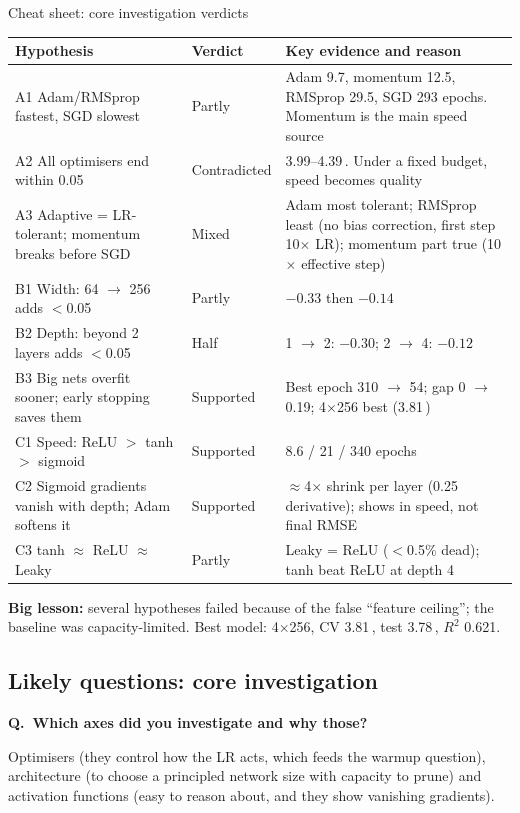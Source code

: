 \documentclass[11pt,a4paper]{article}
\newcommand{\A}{\,\text{\AA}}
\newcounter{qnum}
\newcommand{\Q}[1]{\refstepcounter{qnum}\par\medskip\noindent\textbf{Q\theqnum.\ #1}\par\nopagebreak\noindent\ignorespaces}
\begin{document}
\begin{cheat}[unbreakable]{Cheat sheet: core investigation verdicts}
\small
\begin{tabularx}{\linewidth}{@{}p{5.6cm}lY@{}}
\toprule
Hypothesis & Verdict & Key evidence and reason \\
\midrule
A1 Adam/RMSprop fastest, SGD slowest & Partly & Adam 9.7, momentum 12.5, RMSprop 29.5, SGD 293 epochs. Momentum is the main speed source \\
A2 All optimisers end within 0.05\A & Contradicted & 3.99--4.39\A. Under a fixed budget, speed becomes quality \\
A3 Adaptive = LR-tolerant; momentum breaks before SGD & Mixed & Adam most tolerant; RMSprop least (no bias correction, first step 10$\times$ LR); momentum part true (10$\times$ effective step) \\
B1 Width: 64 $\to$ 256 adds $<$0.05\A & Partly & $-0.33$ then $-0.14$\A \\
B2 Depth: beyond 2 layers adds $<$0.05\A & Half & 1 $\to$ 2: $-0.30$; 2 $\to$ 4: $-0.12$\A \\
B3 Big nets overfit sooner; early stopping saves them & Supported & Best epoch 310 $\to$ 54; gap 0 $\to$ 0.19; 4$\times$256 best (3.81\A) \\
C1 Speed: ReLU $>$ tanh $>$ sigmoid & Supported & 8.6 / 21 / 340 epochs \\
C2 Sigmoid gradients vanish with depth; Adam softens it & Supported & $\approx$4$\times$ shrink per layer (0.25 derivative); shows in speed, not final RMSE \\
C3 tanh $\approx$ ReLU $\approx$ Leaky & Partly & Leaky = ReLU ($<$0.5\% dead); tanh beat ReLU at depth 4 \\
\bottomrule
\end{tabularx}
\textbf{Big lesson:} several hypotheses failed because of the false ``feature ceiling''; the baseline was capacity-limited.
Best model: 4$\times$256, CV 3.81\A, test 3.78\A, $R^2$ 0.621.
\end{cheat}

\subsection{Likely questions: core investigation}

\Q{Which axes did you investigate and why those?}
Optimisers (they control how the LR acts, which feeds the warmup question), architecture (to choose a principled
network size with capacity to prune) and activation functions (easy to reason about, and they show vanishing gradients).
\end{document}
